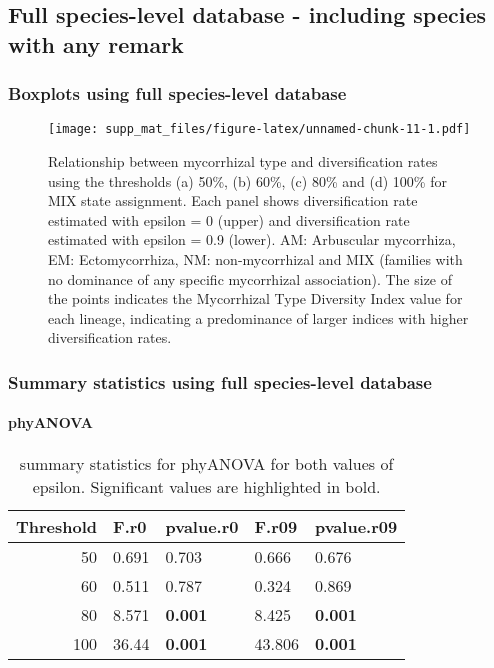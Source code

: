 \documentclass[]{article}
\let\oldparagraph\paragraph
\renewcommand{\paragraph}[1]{\oldparagraph{#1}\mbox{}}
\begin{document}
\hypertarget{full-species-level-database---including-species-with-any-remark}{%
\subsection{Full species-level database - including species with any
remark}\label{full-species-level-database---including-species-with-any-remark}}

\hypertarget{boxplots-using-full-species-level-database}{%
\subsubsection{Boxplots using full species-level
database}\label{boxplots-using-full-species-level-database}}

\begin{figure}
\centering
\texttt{[image: supp\_mat\_files/figure-latex/unnamed-chunk-11-1.pdf]}
\caption{Relationship between mycorrhizal type and diversification rates
using the thresholds (a) 50\%, (b) 60\%, (c) 80\% and (d) 100\% for MIX
state assignment. Each panel shows diversification rate estimated with
epsilon = 0 (upper) and diversification rate estimated with epsilon =
0.9 (lower). AM: Arbuscular mycorrhiza, EM: Ectomycorrhiza, NM:
non-mycorrhizal and MIX (families with no dominance of any specific
mycorrhizal association). The size of the points indicates the
Mycorrhizal Type Diversity Index value for each lineage, indicating a
predominance of larger indices with higher diversification rates.}
\end{figure}

\hypertarget{summary-statistics-using-full-species-level-database}{%
\subsubsection{Summary statistics using full species-level
database}\label{summary-statistics-using-full-species-level-database}}

\hypertarget{phyanova-2}{%
\paragraph{phyANOVA}\label{phyanova-2}}

\begin{table}[H]

\caption{\label{tab:unnamed-chunk-12}summary statistics for phyANOVA for both values of epsilon. Significant values are highlighted in bold.}
\centering
\begin{tabular}{r|l|l|l|l}
\hline
Threshold & F.r0 & pvalue.r0 & F.r09 & pvalue.r09\\
\hline
50 & 0.691 & 0.703 & 0.666 & 0.676\\
\hline
60 & 0.511 & 0.787 & 0.324 & 0.869\\
\hline
80 & 8.571 & \textbf{0.001} & 8.425 & \textbf{0.001}\\
\hline
100 & 36.44 & \textbf{0.001} & 43.806 & \textbf{0.001}\\
\hline
\end{tabular}
\end{table}
\end{document}
